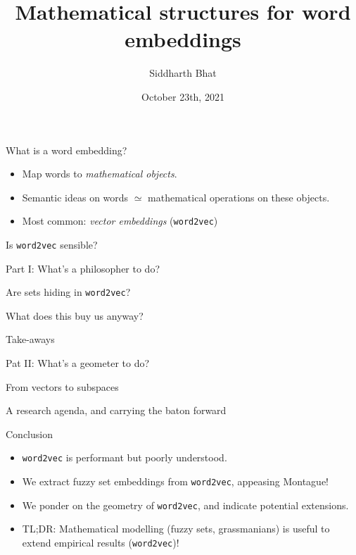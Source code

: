 \documentclass[8pt]{beamer}
\author{Siddharth Bhat}
\date{October 23th, 2021}
\institute{IIIT Hyderabad}
\title{Mathematical structures for word embeddings}
\begin{document}
\maketitle

\begin{frame}[label=sec-1]{What is a word embedding?}
  \pause
\begin{itemize}
  \item Map words to \emph{mathematical objects}.  \pause
  \item Semantic ideas on words $\simeq$ mathematical operations on these objects. \pause
  \item Most common: \emph{vector embeddings} (\texttt{word2vec}) \pause
\end{itemize}
\end{frame}

\begin{frame}{Is \texttt{word2vec} sensible?}

\end{frame}

\begin{frame}{Part I: What's a philosopher to do?}

\end{frame}

\begin{frame}{Are sets hiding in \texttt{word2vec}?}

\end{frame}

\begin{frame}{What does this buy us anyway?}

\end{frame}

\begin{frame}{Take-aways}

\end{frame}

\begin{frame}{Pat II: What's a geometer to do?}

\end{frame}

\begin{frame}{From vectors to subspaces}

\end{frame}

\begin{frame}{A research agenda, and carrying the baton forward}
\end{frame}

\begin{frame}{Conclusion}
  \begin{itemize}
    \item \texttt{word2vec} is performant but poorly understood.
    \item We extract fuzzy set embeddings from \texttt{word2vec}, appeasing Montague!
    \item We ponder on the geometry of \texttt{word2vec}, and indicate potential extensions.
    \item TL;DR: Mathematical modelling (fuzzy sets, grassmanians) is useful to extend empirical results (\texttt{word2vec})!
  \end{itemize}
\end{frame}
\end{document}
